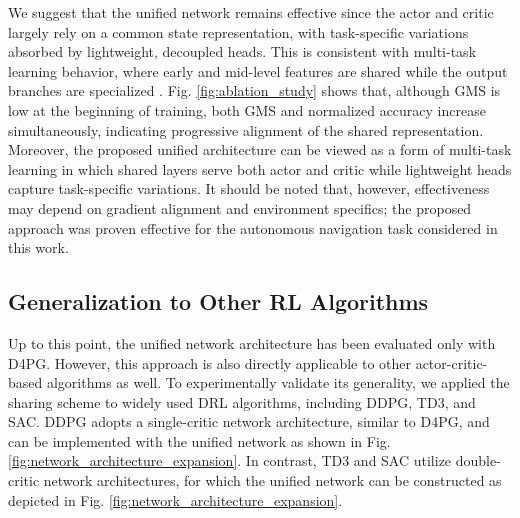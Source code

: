 We suggest that the unified network remains effective since the actor and critic largely rely on a common state representation, with task-specific variations absorbed by lightweight, decoupled heads. This is consistent with multi-task learning behavior, where early and mid-level features are shared while the output branches are specialized \cite{mtl1, mtl2}. Fig. \ref{fig:ablation_study} shows that, although GMS is low at the beginning of training, both GMS and normalized accuracy increase simultaneously, indicating progressive alignment of the shared representation. Moreover, the proposed unified architecture can be viewed as a form of multi-task learning in which shared layers serve both actor and critic while lightweight heads capture task-specific variations. It should be noted that, however, effectiveness may depend on gradient alignment and environment specifics; the proposed approach was proven effective for the autonomous navigation task considered in this work.


\subsection{Generalization to Other RL Algorithms}


Up to this point, the unified network architecture has been evaluated only with D4PG. However, this approach is also directly applicable to other actor-critic-based algorithms as well. To experimentally validate its generality, we applied the sharing scheme to widely used DRL algorithms, including DDPG\cite{DDPG}, TD3\cite{TD3}, and SAC\cite{SAC}. DDPG adopts a single-critic network architecture, similar to D4PG, and can be implemented with the unified network as shown in Fig. \ref{fig:network_architecture_expansion}. In contrast, TD3 and SAC utilize double-critic network architectures, for which the unified network can be constructed as depicted in Fig. \ref{fig:network_architecture_expansion}.

